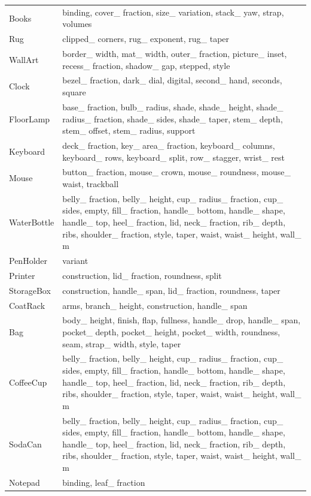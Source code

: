 \begin{longtable}{p{.20\linewidth}p{.74\linewidth}}
Books & binding, cover\_ fraction, size\_ variation, stack\_ yaw, strap, volumes \\
Rug & clipped\_ corners, rug\_ exponent, rug\_ taper \\
WallArt & border\_ width, mat\_ width, outer\_ fraction, picture\_ inset, recess\_ fraction, shadow\_ gap, stepped, style \\
Clock & bezel\_ fraction, dark\_ dial, digital, second\_ hand, seconds, square \\
FloorLamp & base\_ fraction, bulb\_ radius, shade, shade\_ height, shade\_ radius\_ fraction, shade\_ sides, shade\_ taper, stem\_ depth, stem\_ offset, stem\_ radius, support \\
Keyboard & deck\_ fraction, key\_ area\_ fraction, keyboard\_ columns, keyboard\_ rows, keyboard\_ split, row\_ stagger, wrist\_ rest \\
Mouse & button\_ fraction, mouse\_ crown, mouse\_ roundness, mouse\_ waist, trackball \\
WaterBottle & belly\_ fraction, belly\_ height, cup\_ radius\_ fraction, cup\_ sides, empty, fill\_ fraction, handle\_ bottom, handle\_ shape, handle\_ top, heel\_ fraction, lid, neck\_ fraction, rib\_ depth, ribs, shoulder\_ fraction, style, taper, waist, waist\_ height, wall\_ m \\
PenHolder & variant \\
Printer & construction, lid\_ fraction, roundness, split \\
StorageBox & construction, handle\_ span, lid\_ fraction, roundness, taper \\
CoatRack & arms, branch\_ height, construction, handle\_ span \\
Bag & body\_ height, finish, flap, fullness, handle\_ drop, handle\_ span, pocket\_ depth, pocket\_ height, pocket\_ width, roundness, seam, strap\_ width, style, taper \\
CoffeeCup & belly\_ fraction, belly\_ height, cup\_ radius\_ fraction, cup\_ sides, empty, fill\_ fraction, handle\_ bottom, handle\_ shape, handle\_ top, heel\_ fraction, lid, neck\_ fraction, rib\_ depth, ribs, shoulder\_ fraction, style, taper, waist, waist\_ height, wall\_ m \\
SodaCan & belly\_ fraction, belly\_ height, cup\_ radius\_ fraction, cup\_ sides, empty, fill\_ fraction, handle\_ bottom, handle\_ shape, handle\_ top, heel\_ fraction, lid, neck\_ fraction, rib\_ depth, ribs, shoulder\_ fraction, style, taper, waist, waist\_ height, wall\_ m \\
Notepad & binding, leaf\_ fraction \\

\end{longtable}

